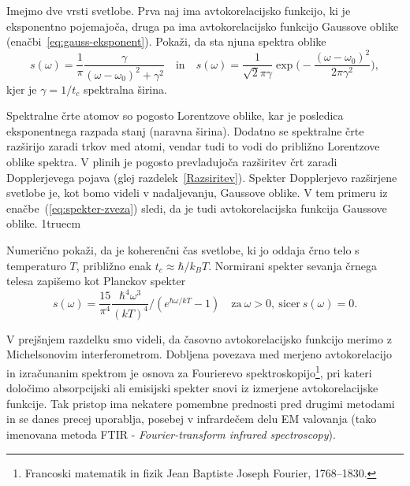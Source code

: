 \begin{definition}
\label{naloga-spekter}
Imejmo dve vrsti svetlobe. Prva naj ima avtokorelacijsko funkcijo, ki je eksponentno pojemajoča, druga
pa ima avtokorelacijsko funkcijo Gaussove oblike (enačbi~\ref{eq:gauss-eksponent}). Pokaži, da sta njuna
spektra oblike
\begin{equation}
s(\omega)=
\frac{1}{\pi}\frac{\gamma}{(\omega-\omega_{0})^{2}+\gamma^{2}} \quad \mathrm{in} \quad 
s(\omega)= \frac{1}{\sqrt{2}\pi\gamma}\exp\big(-
\frac{\left(\omega-\omega_{0}\right)^{2}}{2\pi\gamma^{2}}\big),
\end{equation}
kjer je $\gamma=1/t_{c}$ spektralna širina. 
\end{definition}

Spektralne črte atomov so pogosto Lorentzove oblike, kar je posledica
eksponentnega razpada stanj (naravna širina). Dodatno se spektralne
črte razširijo zaradi trkov med atomi, vendar tudi to vodi do približno Lorentzove
oblike spektra. V plinih je pogosto prevladujoča razširitev črt
zaradi Dopplerjevega pojava (glej razdelek~\ref{Razsiritev}). 
Spekter Dopplerjevo razširjene svetlobe je, kot bomo videli v 
nadaljevanju, Gaussove oblike. V tem primeru iz enačbe~(\ref{eq:spekter-zveza})
sledi, da je tudi avtokorelacijska funkcija Gaussove oblike.
\vglue1truecm

\begin{definition}\label{naloga-Planck}
Numerično pokaži, da je koherenčni čas svetlobe, ki jo oddaja črno telo s 
temperaturo $T$, približno enak $t_{c}\approx{\hbar}/{k_{B}T}$.
Normirani spekter sevanja črnega telesa zapišemo 
kot Planckov spekter 
\begin{equation}
s(\omega)=\frac{15}{\pi^{4}} \frac{\hbar^4\omega^3}{(kT)^4}/\left(e^{\hbar\omega/kT}-1\right)
\quad \textrm{za}~\omega >0,~\textrm{sicer}~s(\omega) = 0.
\label{eq:Planckov-spekter}
\end{equation}
\end{definition}

\begin{remark}
V prejšnjem razdelku smo videli, da časovno avtokorelacijsko funkcijo
merimo z Michelsonovim interferometrom. Dobljena povezava med merjeno
avtokorelacijo in izračunanim spektrom je osnova za Fourierevo 
spektroskopijo\footnote{Francoski matematik in fizik Jean Baptiste Joseph Fourier, 1768--1830.},
pri kateri določimo absorpcijski ali emisijski spekter
snovi iz izmerjene avtokorelacijske funkcije. Tak pristop
ima nekatere pomembne prednosti pred drugimi metodami in se danes
precej uporablja, posebej v infrardečem delu EM valovanja (tako imenovana
metoda FTIR - {\it Fourier-transform infrared spectroscopy}).
\end{remark}

